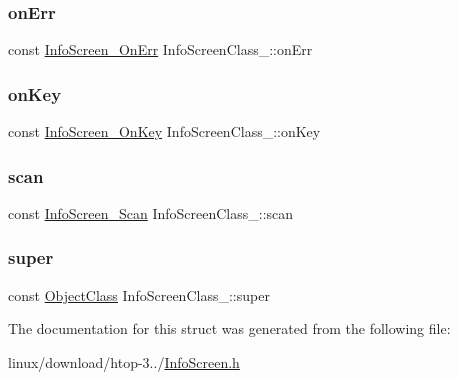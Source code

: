 \mbox{\label{structInfoScreenClass___a4f5e553582c2595e2b72b55cd6ed5d0a}} 
\subsubsection{\texorpdfstring{on\+Err}{onErr}}
{\footnotesize\ttfamily const \hyperlink{InfoScreen_8h_a11622325cc1cdfa5afe9beaf7c7d67bb}{Info\+Screen\+\_\+\+On\+Err} Info\+Screen\+Class\+\_\+\+::on\+Err}

\mbox{\label{structInfoScreenClass___a02be6a307bda4b8ee42998aecdfe0031}} 
\subsubsection{\texorpdfstring{on\+Key}{onKey}}
{\footnotesize\ttfamily const \hyperlink{InfoScreen_8h_a4e1c3f0fd1b989598119d0b28d49e804}{Info\+Screen\+\_\+\+On\+Key} Info\+Screen\+Class\+\_\+\+::on\+Key}

\mbox{\label{structInfoScreenClass___a726fb2becca1f0cb9893c5a106957977}} 
\subsubsection{\texorpdfstring{scan}{scan}}
{\footnotesize\ttfamily const \hyperlink{InfoScreen_8h_a3e85dee971a09c2c150bd817fe83a089}{Info\+Screen\+\_\+\+Scan} Info\+Screen\+Class\+\_\+\+::scan}

\mbox{\label{structInfoScreenClass___a9921201ff374d186aa1e2b22ec323601}} 
\subsubsection{\texorpdfstring{super}{super}}
{\footnotesize\ttfamily const \hyperlink{Object_8h_a6feb151c3b8f61fae503dfbcdc3d6a54}{Object\+Class} Info\+Screen\+Class\+\_\+\+::super}



The documentation for this struct was generated from the following file\+:\begin{DoxyCompactItemize}
\item 
linux/download/htop-\/3../\hyperlink{InfoScreen_8h}{Info\+Screen.\+h}\end{DoxyCompactItemize}
